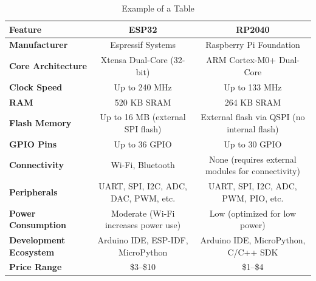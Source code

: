 \documentclass[conference]{IEEEtran}
\begin{document}
\begin{table}
\centering
\caption{Example of a Table}
\label{tab:esp32_vs_rp2040}
\renewcommand{\arraystretch}{1.2} %
\begin{tabular}{|l|c|c|}
\hline
\textbf{Feature} & \textbf{ESP32} & \textbf{RP2040} \\ \hline
\textbf{Manufacturer} & Espressif Systems & Raspberry Pi Foundation \\ \hline
\textbf{Core Architecture} & Xtensa Dual-Core (32-bit) & ARM Cortex-M0+ Dual-Core \\ \hline
\textbf{Clock Speed} & Up to 240 MHz & Up to 133 MHz \\ \hline
\textbf{RAM} & 520 KB SRAM & 264 KB SRAM \\ \hline
\textbf{Flash Memory} & Up to 16 MB (external SPI flash) & External flash via QSPI (no internal flash) \\ \hline
\textbf{GPIO Pins} & Up to 36 GPIO & Up to 30 GPIO \\ \hline
\textbf{Connectivity} & Wi-Fi, Bluetooth & None (requires external modules for connectivity) \\ \hline
\textbf{Peripherals} & 
UART, SPI, I2C, ADC, DAC, PWM, etc. & 
UART, SPI, I2C, ADC, PWM, PIO, etc. \\ \hline
\textbf{Power Consumption} & Moderate (Wi-Fi increases power use) & Low (optimized for low power) \\ \hline
\textbf{Development Ecosystem} & 
Arduino IDE, ESP-IDF, MicroPython & 
Arduino IDE, MicroPython, C/C++ SDK \\ \hline
\textbf{Price Range} & \$3–\$10 & \$1–\$4 \\ \hline
\end{tabular}
\end{table}
\end{document}
